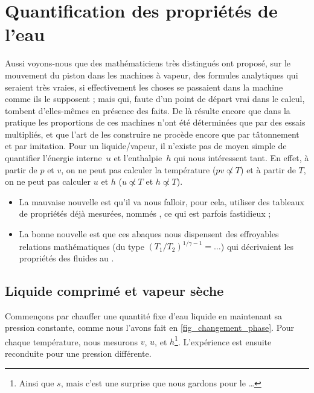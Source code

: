 \section{Quantification des propriétés de l’eau}

			Aussi voyons-nous que des mathématiciens très distingués ont proposé, sur le mouvement du piston dans les machines à vapeur, des formules analytiques qui seraient très vraies, si effectivement les choses se passaient dans la machine comme ils le supposent ; mais qui, faute d’un point de départ vrai dans le calcul, tombent d’elles-mêmes en présence des faits. De là résulte encore que dans la pratique les proportions de ces machines n’ont été déterminées que par des essais multipliés, et que l’art de les construire ne procède encore que par tâtonnement et par imitation.
	Pour un liquide/vapeur, il n’existe pas de moyen simple de quantifier l’énergie interne~$u$ et l’enthalpie~$h$ qui nous intéressent tant. En effet, à partir de $p$ et $v$, on ne peut pas calculer la température ($p v \not\propto T$) et à partir de $T$, on ne peut pas calculer $u$ et $h$ ($u \not\propto T$ et $h \not\propto T$).
	
	\begin{itemize}
		\item La mauvaise nouvelle est qu’il va nous falloir, pour cela, utiliser des tableaux de propriétés déjà mesurées, nommés , ce qui est parfois fastidieux ;
		\item La bonne nouvelle est que ces abaques nous dispensent des effroyables relations mathématiques (du type $(T_1/T_2)^{1/\gamma-1} = \ldots$) qui décrivaient les propriétés des fluides au \coursquatre.
	\end{itemize}

	\subsection{Liquide comprimé et vapeur sèche}
 		
		Commençons par chauffer une quantité fixe d’eau liquide en maintenant sa pression constante, comme nous l’avons fait en \cref{fig_changement_phase}. Pour chaque température, nous mesurons $v$, $u$, et $h$\footnote{Ainsi que $s$, mais c’est une surprise que nous gardons pour le \courshuitshort…}. L’expérience est ensuite reconduite pour une pression différente.
		
